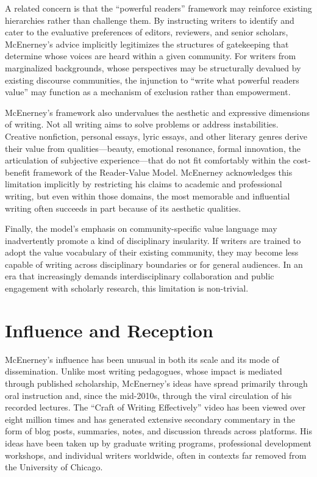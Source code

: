 \documentclass[12pt]{article}
\begin{document}
A related concern is that the ``powerful readers'' framework may reinforce existing hierarchies rather than challenge them. By instructing writers to identify and cater to the evaluative preferences of editors, reviewers, and senior scholars, McEnerney's advice implicitly legitimizes the structures of gatekeeping that determine whose voices are heard within a given community. For writers from marginalized backgrounds, whose perspectives may be structurally devalued by existing discourse communities, the injunction to ``write what powerful readers value'' may function as a mechanism of exclusion rather than empowerment.

McEnerney's framework also undervalues the aesthetic and expressive dimensions of writing. Not all writing aims to solve problems or address instabilities. Creative nonfiction, personal essays, lyric essays, and other literary genres derive their value from qualities---beauty, emotional resonance, formal innovation, the articulation of subjective experience---that do not fit comfortably within the cost-benefit framework of the Reader-Value Model. McEnerney acknowledges this limitation implicitly by restricting his claims to academic and professional writing, but even within those domains, the most memorable and influential writing often succeeds in part because of its aesthetic qualities.

Finally, the model's emphasis on community-specific value language may inadvertently promote a kind of disciplinary insularity. If writers are trained to adopt the value vocabulary of their existing community, they may become less capable of writing across disciplinary boundaries or for general audiences. In an era that increasingly demands interdisciplinary collaboration and public engagement with scholarly research, this limitation is non-trivial.

\section*{Influence and Reception}

McEnerney's influence has been unusual in both its scale and its mode of dissemination. Unlike most writing pedagogues, whose impact is mediated through published scholarship, McEnerney's ideas have spread primarily through oral instruction and, since the mid-2010s, through the viral circulation of his recorded lectures. The ``Craft of Writing Effectively'' video has been viewed over eight million times and has generated extensive secondary commentary in the form of blog posts, summaries, notes, and discussion threads across platforms. His ideas have been taken up by graduate writing programs, professional development workshops, and individual writers worldwide, often in contexts far removed from the University of Chicago.
\end{document}
